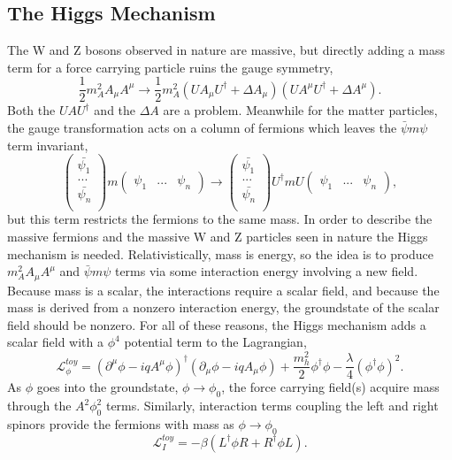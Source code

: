 \documentclass[12pt]{article}
\begin{document}
\subsection{The Higgs Mechanism}
The W and Z bosons observed in nature are massive, but directly adding a mass term for a force carrying particle ruins the gauge symmetry, 
\begin{equation}
\frac{1}{2}m_A^2A_\mu A^\mu \rightarrow \frac{1}{2}m_A^2(UA_\mu U^\dagger + \Delta A_\mu)(UA^\mu U^\dagger + \Delta A^\mu). 
\end{equation}
Both the  $UAU^\dagger$ and the $\Delta A$ are a problem. Meanwhile for the matter particles, the gauge transformation acts on a column of fermions which leaves the $\bar{\psi}m\psi$ term invariant,  
\begin{equation}
\begin{pmatrix}
\bar{\psi_1} \\
...          \\
\bar{\psi_n} \\
\end{pmatrix}
m
\begin{pmatrix}
\psi_1 & ... & \psi_n
\end{pmatrix}
\rightarrow
\begin{pmatrix}
\bar{\psi_1} \\
...          \\
\bar{\psi_n} \\
\end{pmatrix}
U^\dagger mU
\begin{pmatrix}
\psi_1 & ... & \psi_n
\end{pmatrix},
\end{equation}
but this term restricts the fermions to the same mass. In order to describe the massive fermions and the massive W and Z particles seen in nature the Higgs mechanism is needed. Relativistically, mass is energy, so the idea is to produce $m_A^2A_\mu A^\mu$ and $\bar{\psi}m\psi$ terms via some interaction energy involving a new field. Because mass is a scalar, the interactions require a scalar field, and because the mass is derived from a nonzero interaction energy, the groundstate of the scalar field should be nonzero. For all of these reasons, the Higgs mechanism adds a scalar field with a $\phi^4$ potential term to the Lagrangian, 
\begin{equation}
\label{eq:toyew1}
\mathcal{L}^{toy}_\phi = (\partial^\mu\phi - iqA^\mu\phi)^\dagger(\partial_\mu\phi - iqA_\mu\phi) + \frac{m_h^2}{2}\phi^\dagger\phi - \frac{\lambda}{4}(\phi^\dagger\phi)^2.
\end{equation}
As $\phi$ goes into the groundstate, $\phi \rightarrow \phi_0$, the force carrying field(s) acquire mass through the $A^2\phi_0^2$ terms. Similarly, interaction terms coupling the left and right spinors provide the fermions with mass as $\phi \rightarrow \phi_0$
\begin{equation}
\label{eq:toyew2}
\mathcal{L}^{toy}_I = -\beta(L^\dagger\phi R + R^\dagger\phi L).
\end{equation}
\end{document}
